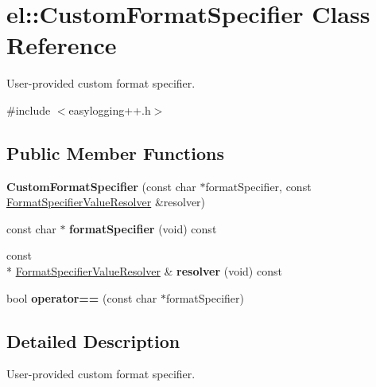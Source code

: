 \hypertarget{classel_1_1CustomFormatSpecifier}{\section{el\-:\-:Custom\-Format\-Specifier Class Reference}
\label{classel_1_1CustomFormatSpecifier}
}


User-\/provided custom format specifier.  




{\ttfamily \#include $<$easylogging++.\-h$>$}

\subsection*{Public Member Functions}
\begin{DoxyCompactItemize}
\item 
\hypertarget{classel_1_1CustomFormatSpecifier_a1d1bfa8b489d2908ee543023a51e58f6}{{\bfseries Custom\-Format\-Specifier} (const char $\ast$format\-Specifier, const \hyperlink{namespaceel_a7127f2de2769e2a199a3665f42028a16}{Format\-Specifier\-Value\-Resolver} \&resolver)}\label{classel_1_1CustomFormatSpecifier_a1d1bfa8b489d2908ee543023a51e58f6}

\item 
\hypertarget{classel_1_1CustomFormatSpecifier_a0be00787b7ca1caedd32e1627d76fd24}{const char $\ast$ {\bfseries format\-Specifier} (void) const }\label{classel_1_1CustomFormatSpecifier_a0be00787b7ca1caedd32e1627d76fd24}

\item 
\hypertarget{classel_1_1CustomFormatSpecifier_ac426e6771ae35e060313b8683b88adc8}{const \\*
\hyperlink{namespaceel_a7127f2de2769e2a199a3665f42028a16}{Format\-Specifier\-Value\-Resolver} \& {\bfseries resolver} (void) const }\label{classel_1_1CustomFormatSpecifier_ac426e6771ae35e060313b8683b88adc8}

\item 
\hypertarget{classel_1_1CustomFormatSpecifier_ae17a9fbf8c5a28867308fcb8966a3aa0}{bool {\bfseries operator==} (const char $\ast$format\-Specifier)}\label{classel_1_1CustomFormatSpecifier_ae17a9fbf8c5a28867308fcb8966a3aa0}

\end{DoxyCompactItemize}


\subsection{Detailed Description}
User-\/provided custom format specifier. 


